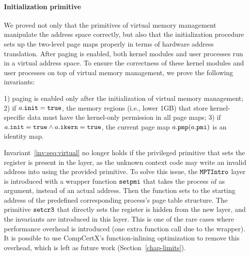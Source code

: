 \paragraph{Initialization primitive}
We proved not only that the primitives of virtual memory management
manipulate the address space correctly,
but also that the initialization procedure sets up the two-level page maps properly
in terms of hardware address translation.
After paging is enabled, both kernel modules and user processes
run in a virtual address space.
To ensure the correctness of these kernel modules and user processes on top of virtual memory
management, we prove the following invariants:
\begin{invariant}
\label{inv:seq:virtual}
1) paging is enabled only after the initialization of virtual memory management;
2) if $a.{\texttt{init}} ={\texttt{true}}$, the memory regions (i.e., lower 1GB) that store kernel-specific data must have the kernel-only 
permission in all page maps;
3) if $a.{\texttt{init}} ={\texttt{true}} \wedge a.{\texttt{ikern}} ={\texttt{true}} $, 
the current page map $a.{\texttt{pmp}}(a.{\texttt{pmi}})$
is an identity map.
\end{invariant}

Invariant~\ref{inv:seq:virtual} no longer holds 
if the privileged primitive that sets the 
register is present in the layer, as the unknown context code may write
an invalid address into  using the provided primitive. To solve this issue, 
the ${\texttt{MPTIntro}}$
layer is introduced with a wrapper function 
${\texttt{setpmi}}$
that takes the process $id$ as argument,
instead of an actual address. Then the function sets  to the
starting address of the predefined corresponding process's page table structure.
The primitive ${\texttt{setcr3}}$ that directly sets the  register is hidden from the
new layer, and the invariants are introduced in this layer.
This is one of the rare cases where performance overhead is introduced
(one extra function call due to the wrapper).
It is possible to use CompCertX's function-inlining optimization
to remove this overhead, which is left as future work (\cf Section~\ref{chap-limits}).

